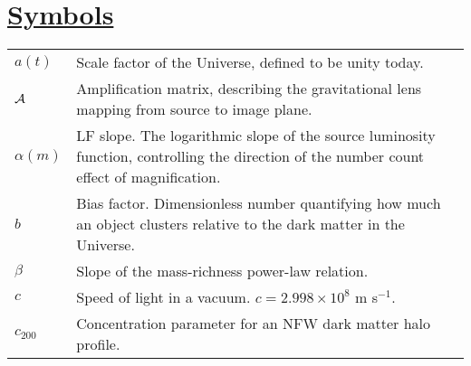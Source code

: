 \section*{\underline{Symbols}}
\begin{tabular}{p{0.6in}p{5.8in}}

$a(t)$ & Scale factor of the Universe, defined to be unity today. \\
$\cal{A}$ & Amplification matrix, describing the gravitational lens mapping from source to image plane. \\
$\alpha(m)$ & \acs{LF} slope. The logarithmic slope of the source luminosity function, controlling the direction of the number count effect of magnification. \\
$b$ & Bias factor. Dimensionless number quantifying how much an object clusters relative to the dark matter in the Universe. \\ 
$\beta$ & Slope of the mass-richness power-law relation. \\
$c$ & Speed of light in a vacuum. $c = 2.998 \times 10^8$ m s$^{-1}$. \\
$c_{200}$ & Concentration parameter for an \acs{NFW} dark matter halo profile. \\

\end{tabular}
